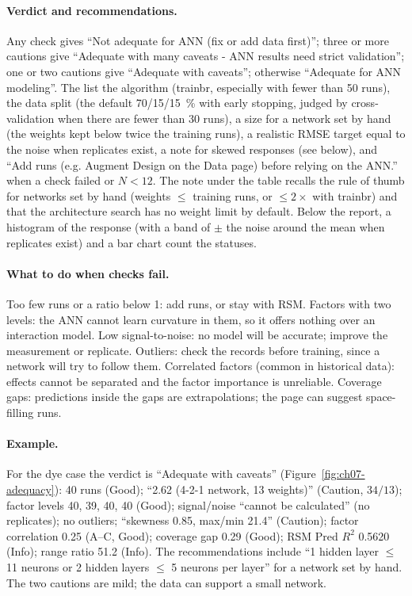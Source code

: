 \paragraph{Verdict and recommendations.} Any  check gives ``Not adequate for ANN (fix or add
data first)''; three or more cautions give ``Adequate with many caveats - ANN results need strict validation'';
one or two cautions give ``Adequate with caveats''; otherwise ``Adequate for ANN modeling''. The
 list the algorithm (trainbr, especially with fewer than 50 runs), the data split (the
default 70/15/15~\% with early stopping, judged by cross-validation when there are fewer than 30 runs), a size for
a network set by hand (the weights kept below twice the training runs), a realistic RMSE target equal to the
noise when replicates exist, a note for skewed responses (see below), and ``Add runs (e.g. Augment Design on the
Data page) before relying on the ANN.'' when a check failed or $N<12$. The note under the table recalls the rule
of thumb for networks set by hand (weights $\le$ training runs, or $\le 2\times$ with trainbr) and that the
architecture search has no weight limit by default. Below the report, a histogram of the response (with a band of
$\pm$ the noise around the mean when replicates exist) and a bar chart count the statuses.

\paragraph{What to do when checks fail.} Too few runs or a ratio below 1: add runs, or stay with RSM. Factors
with two levels: the ANN cannot learn curvature in them, so it offers nothing over an interaction model. Low
signal-to-noise: no model will be accurate; improve the measurement or replicate. Outliers: check the records
before training, since a network will try to follow them. Correlated factors (common in historical data): effects
cannot be separated and the factor importance is unreliable. Coverage gaps: predictions inside the gaps are
extrapolations; the  page can suggest space-filling runs.

\paragraph{Example.} For the dye case the verdict is ``Adequate with caveats'' (Figure~\ref{fig:ch07-adequacy}):
 40 runs (Good);  ``2.62 (4-2-1 network, 13 weights)''
(Caution, $34/13$); factor levels 40, 39, 40, 40 (Good); signal/noise ``cannot be calculated'' (no replicates);
no outliers;  ``skewness 0.85, max/min 21.4'' (Caution); factor correlation 0.25 (A--C,
Good); coverage gap 0.29 (Good); RSM Pred $R^2$ 0.5620 (Info); range ratio 51.2 (Info). The recommendations
include ``1 hidden layer $\le$ 11 neurons or 2 hidden layers $\le$ 5 neurons per layer'' for a network set by
hand. The two cautions are mild; the data can support a small network.

